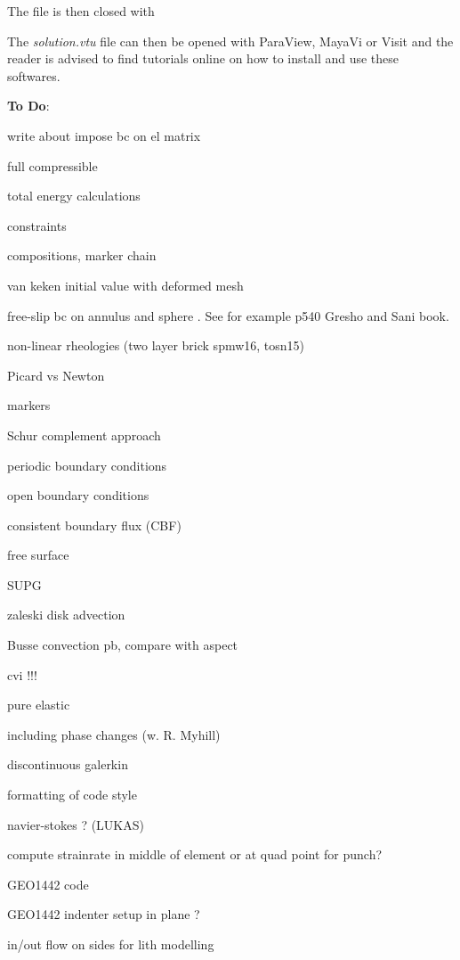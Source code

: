 \documentclass[a4paper]{article}
\begin{document}


The file is then closed with



The {\sl solution.vtu} file can then be opened with ParaView, MayaVi or Visit and the reader 
is advised to find tutorials online on how to install and use these softwares. 





\newpage
{\bf To Do}:

write about impose bc on el matrix

full compressible 

total energy calculations

constraints

compositions, marker chain

van keken initial value with deformed mesh

free-slip bc on annulus and sphere . See for example p540 Gresho and Sani book.

non-linear rheologies (two layer brick spmw16, tosn15) 

Picard vs Newton

markers

Schur complement approach

periodic boundary conditions

open boundary conditions

consistent boundary flux (CBF)

free surface 

SUPG

zaleski disk advection

Busse convection pb, compare with aspect 

cvi !!!

pure elastic 

including phase changes (w. R. Myhill)

discontinuous galerkin

formatting of code style

navier-stokes ? (LUKAS)


compute strainrate in middle of element or at quad point for punch?

GEO1442 code 

GEO1442 indenter setup in plane ?

in/out flow on sides for lith modelling
\end{document}
